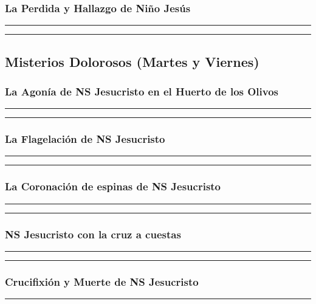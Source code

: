 \documentclass[11pt,a4paper]{report}
\begin{document}
\subsubsection*{La Perdida y Hallazgo de Niño Jesús}


\rule{\textwidth}{0.5pt}

\rule{\textwidth}{0.5pt}


\subsection*{Misterios Dolorosos (Martes y Viernes)}
\subsubsection*{La Agonía de NS Jesucristo en el Huerto de los Olivos}


\rule{\textwidth}{0.5pt}

\rule{\textwidth}{0.5pt}


\subsubsection*{La Flagelación de NS Jesucristo}


\rule{\textwidth}{0.5pt}

\rule{\textwidth}{0.5pt}


\subsubsection*{La Coronación de espinas de NS Jesucristo}


\rule{\textwidth}{0.5pt}

\rule{\textwidth}{0.5pt}


\subsubsection*{NS Jesucristo con la cruz a cuestas}


\rule{\textwidth}{0.5pt}

\rule{\textwidth}{0.5pt}


\subsubsection*{Crucifixión y Muerte de NS Jesucristo}


\rule{\textwidth}{0.5pt}
\end{document}
